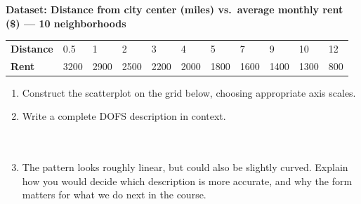 \documentclass[10pt]{article}
\begin{document}
\vspace{0.12in}

\begin{tcolorbox}[colback=white, colframe=black!40, boxrule=0.8pt, arc=2mm,
    left=4mm, right=4mm, top=3mm, bottom=3mm,
    title={\textbf{Tier E --- Extension}}, fonttitle=\bfseries, halign title=center]
\small

\textbf{Dataset: Distance from city center (miles) vs.\ average monthly rent (\$) --- 10 neighborhoods}

\vspace{6pt}
\renewcommand{\arraystretch}{1.4}
\begin{tabularx}{\linewidth}{@{} l *{10}{C{0.82cm}} @{}}
\textbf{Distance} & 0.5 & 1 & 2 & 3 & 4 & 5 & 7 & 9 & 10 & 12 \\
\textbf{Rent}     & 3200 & 2900 & 2500 & 2200 & 2000 & 1800 & 1600 & 1400 & 1300 & 800 \\
\end{tabularx}

\vspace{10pt}

\begin{enumerate}[leftmargin=1.6em, itemsep=0.18in]

  \item Construct the scatterplot on the grid below, choosing appropriate axis scales.

        \vspace{6pt}
        \begin{center}
        \end{center}

  \item Write a complete DOFS description in context.\\[8pt]
        \writeline\\[2pt]\writeline\\[2pt]\writeline

  \item The pattern looks roughly linear, but could also be slightly curved. Explain how
        you would decide which description is more accurate, and why the form matters for
        what we do next in the course.\\[8pt]
        \writeline\\[2pt]\writeline\\[2pt]\writeline


\end{enumerate}
\end{tcolorbox}
\end{document}
